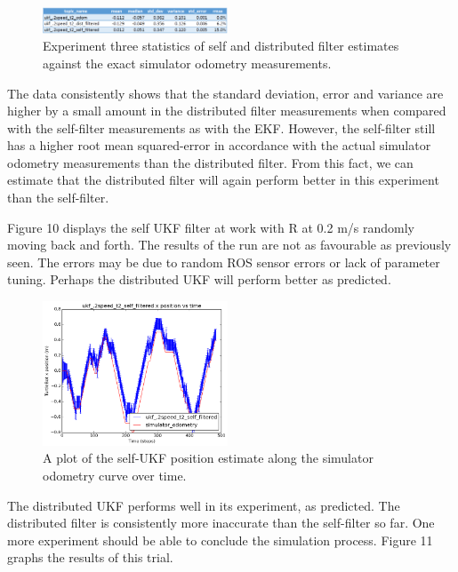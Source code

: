 \documentclass[conference]{IEEEtran} \usepackage[T1]{fontenc} \usepackage[backend=biber, style=ieee]{biblatex}
\begin{document}
\begin{figure}[!ht]
\label{pic9} 
\centering 
\includegraphics[width=0.49\textwidth]{ukf_2_table}
\caption{Experiment three statistics of self and distributed filter estimates against the exact simulator odometry measurements.} 
\end{figure}

The data consistently shows that the standard deviation, error and variance are higher by a small amount in 
the distributed filter measurements when compared with the self-filter measurements as with the EKF. However, 
the self-filter still has a higher root mean squared-error in accordance with the actual simulator odometry 
measurements than the distributed filter. From this fact, we can estimate that the distributed filter will 
again perform better in this experiment than the self-filter.

Figure 10 displays the self UKF filter at work with R at 0.2 m/s randomly moving back 
and forth. The results of the run are not as favourable as previously seen. The 
errors may be due to random ROS sensor errors or lack of parameter tuning. Perhaps 
the distributed UKF will perform better as predicted.

\begin{figure}
\centering 
\includegraphics[width=0.49\textwidth]{ukf_2speed_t2_self_filtered_pos_err_graph}
\caption {A plot of the self-UKF position estimate along the simulator odometry curve over time.}
\label{pic10} 
\end{figure}

The distributed UKF performs well in its experiment, as predicted. The distributed filter is consistently 
more inaccurate than the self-filter so far. One more experiment should be able to conclude the simulation process. 
Figure 11 graphs the results of this trial. 
\end{document}
